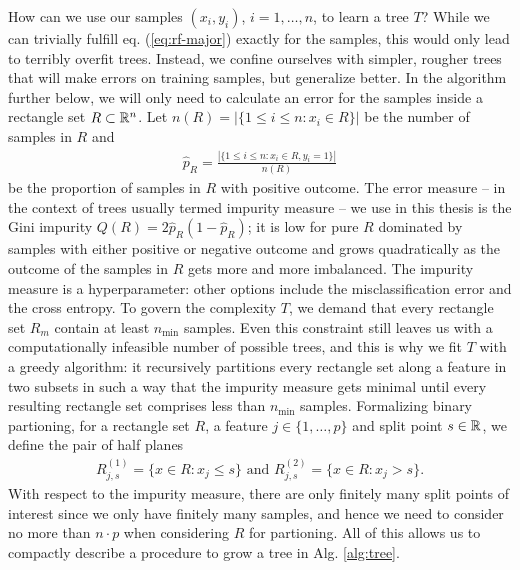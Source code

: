 How can we use our samples $(x_i, y_i)$, $i = 1, \ldots, n$, to learn a tree $T$? While we can 
trivially fulfill eq. (\ref{eq:rf-major}) exactly for the samples, this would only lead to terribly 
overfit trees. Instead, we confine ourselves with simpler, rougher trees that will make errors on 
training samples, but generalize better. 
In the algorithm further below, we will only need to calculate an error for the samples inside a 
rectangle set $R \subset \mathbb{R}^n$. Let $n(R) = |\{ 1 \leq i \leq n: x_i \in R \}|$ be the number of 
samples in $R$ and
\begin{align}
    \hat{p}_R = \frac{|\{ 1 \leq i \leq n: x_i \in R, y_i = 1 \}|}{n(R)}
\end{align}
be the proportion of samples in $R$ with positive outcome. The error measure -- in the context of 
trees usually termed impurity measure -- we use in this thesis
is the Gini impurity $Q(R) = 2 \hat{p}_R (1 - \hat{p}_R)$; it is low for pure $R$ dominated by 
samples with either positive or negative outcome and grows quadratically as the outcome of the 
samples in $R$ gets more and more imbalanced. The impurity measure is a hyperparameter: other 
options include the misclassification error and the cross entropy. To govern the complexity $T$,
we demand that every rectangle set $R_m$ contain at least $n_\text{min}$ samples. Even this 
constraint still leaves us with a computationally infeasible number of possible trees, and this is 
why we fit $T$ with a greedy algorithm: it recursively partitions every rectangle set along a 
feature in two subsets in such a way that the impurity measure gets minimal until every resulting 
rectangle set comprises less than $n_\text{min}$ samples. Formalizing binary partioning, for a 
rectangle set $R$, a feature $j \in \{1, \ldots, p\}$ and split point $s \in \mathbb{R}$, we define 
the pair of half planes
\begin{align}
    R^{(1)}_{j, s} = \{x \in R: x_j \leq s\} \text{ and } R^{(2)}_{j, s} = \{x \in R: x_j > s\}.
\end{align}
With respect to the impurity measure, there are only finitely many split points of interest since 
we only have finitely many samples, and hence we need to consider no more than $n \cdot p$ when 
considering $R$ for partioning. All of this allows us to compactly describe a procedure to grow a 
tree in Alg. \ref{alg:tree}.


